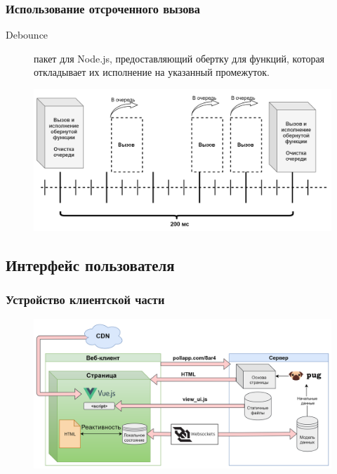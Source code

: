 \documentclass{beamer}
\begin{document}
\begin{frame}
\frametitle{Использование отсроченного вызова}
\begin{description}
	\item[Debounce] пакет для Node.js, предоставляющий обертку для функций, которая откладывает их исполнение на указанный промежуток.
\end{description} 
	 \begin{figure}
	 	\includegraphics[width=\linewidth]{img/debounce.png}
	 \end{figure}
\end{frame}


\subsection{Интерфейс пользователя}
\begin{frame}
\frametitle{Устройство клиентской части}
\begin{figure}
	\includegraphics[width=\linewidth]{img/ui.png}
\end{figure}
\end{frame}
\end{document}
